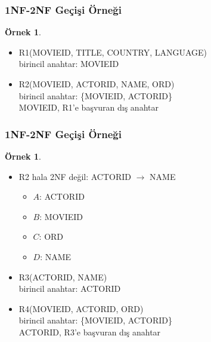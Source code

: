 \documentclass[dvipsnames]{beamer}
\theoremstyle{definition}
\theoremstyle{example}
\newtheorem{ornek}[theorem]{Örnek}
\theoremstyle{plain}
\begin{document}
\begin{frame}
  \frametitle{1NF-2NF Geçişi Örneği}

  \begin{ornek}
    \begin{itemize}
      \item R1(MOVIEID, TITLE, COUNTRY, LANGUAGE)\\
        birincil anahtar: MOVIEID

      \pause
      \item R2(MOVIEID, ACTORID, NAME, ORD)\\
        birincil anahtar: \{MOVIEID, ACTORID\}\\
        MOVIEID, R1'e başvuran dış anahtar
    \end{itemize}
 \end{ornek}
\end{frame}

\begin{frame}
  \frametitle{1NF-2NF Geçişi Örneği}

  \begin{ornek}
    \begin{itemize}
      \item R2 hala 2NF değil: ACTORID $\rightarrow$ NAME

      \pause
      \begin{itemize}
        \item $A$: ACTORID
        \item $B$: MOVIEID
        \item $C$: ORD
        \item $D$: NAME
      \end{itemize}
    \end{itemize}

    \pause
    \begin{itemize}
      \item R3(ACTORID, NAME)\\
        birincil anahtar: ACTORID

      \pause
      \item R4(MOVIEID, ACTORID, ORD)\\
        birincil anahtar: \{MOVIEID, ACTORID\}\\
        ACTORID, R3'e başvuran dış anahtar
    \end{itemize}
  \end{ornek}
\end{frame}
\end{document}
